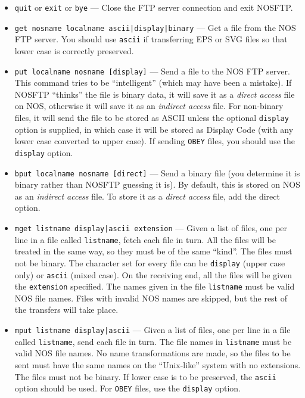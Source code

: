 \documentclass[a4paper,twoside,11pt]{article}
\newcommand{\textttc}[1]{\texttt{\textcolor{OurRed}{#1}}}
\begin{document}
\begin{itemize}
\item \textttc{quit} or \textttc{exit} or \textttc{bye} --- Close the FTP server connection and exit NOSFTP.
\item \textttc{get nosname localname ascii|display|binary} --- Get a file from the NOS FTP server. You should
  use \texttt{ascii} if transferring EPS or SVG files so that lower case is correctly preserved.
\item \textttc{put localname nosname [display]} --- Send a file to the NOS FTP server. This command
  tries to be ``intelligent'' (which may have been a mistake). If NOSFTP ``thinks'' the file is binary data,
  it will save it as a \emph{direct access} file on NOS, otherwise it will save it as an \emph{indirect access} file.
  For non-binary files, it will send the file to be stored as ASCII unless
  the optional \texttt{display} option is supplied,
  in which case it will be stored as Display Code (with any lower case converted to upper case).
  If sending \texttt{OBEY} files, you should use the \texttt{display} option.
\item \textttc{bput localname nosname [direct]} --- Send a binary file (you determine it is binary rather than
  NOSFTP guessing it is). By default, this is stored on NOS as an \emph{indirect access} file. To store it as a
  \emph{direct access} file, add the direct option.
\item \textttc{mget listname display|ascii extension} --- Given a list of files, one per line in a file called
  \texttt{listname}, fetch each file in turn. All the files will be treated in the same way, so they must be
  of the same ``kind''. The files must not be binary. The character set for every file can be \texttt{display}
  (upper case only) or \texttt{ascii} (mixed case). On the receiving end, all the files will be given the
  \texttt{extension} specified. The names given in the file \texttt{listname} must be valid NOS file names.
  Files with invalid NOS names are skipped, but the rest of the transfers will take place.
\item \textttc{mput listname display|ascii} ---  Given a list of files, one per line in a file called
  \texttt{listname}, send each file in turn. The file names in \texttt{listname} must be valid NOS file names.
  No name transformations are made, so the files to be sent must have the same names on the ``Unix-like''
  system with no extensions. The files must not be binary. If lower case is to be preserved, the \texttt{ascii}
  option should be used. For \texttt{OBEY} files, use the \texttt{display} option.

\end{itemize}
\end{document}
